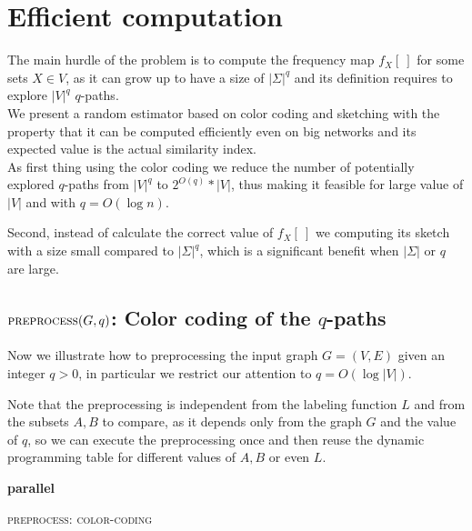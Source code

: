 \section{Efficient computation}

The main hurdle of the problem is to compute the frequency map $f_{X}[\ ]$ for some sets $X \in V$,
as it can grow up to have a size of $|\Sigma|^{q}$ and its definition requires to explore $|V|^{q}$ $q$-paths.\\

We present a random estimator based on color coding and sketching with the property that it can be computed
efficiently even on big networks and its expected value is the actual similarity index.\\

As first thing using the color coding we reduce the number of potentially explored $q$-paths from $|V|^{q}$ to $2^{O(q)} * |V|$, 
thus making it feasible for large value of $|V|$ and with $q = O(\log n)$.

Second, instead of calculate the correct value of $f_{X}[\ ]$ we computing its sketch with a size small compared to $|\Sigma|^{q}$,
which is a significant benefit when $|\Sigma|$ or $q$ are large.

\subsection*{$\textsc{preprocess}(G,q)$: Color coding of the $q$-paths}

Now we illustrate how to preprocessing the input graph $G=(V,E)$ given an integer $q > 0$, in particular we restrict our attention to $q = O(\log |V|)$.

Note that the preprocessing is independent from the labeling function $L$ and from the subsets $A,B$ to compare, 
as it depends only from the graph $G$ and the value of $q$, so we can execute the preprocessing once and 
then reuse the dynamic programming table for different values of $A,B$ or even $L$.\\

\begin{algorithm}[h]
	
	\small
	\DontPrintSemicolon
	\BlankLine
	\textbf{parallel} 
	\BlankLine
	\caption{\textsc{preprocess}: \textsc{color-coding}}
	\label{alg:color-coding}
\end{algorithm}

